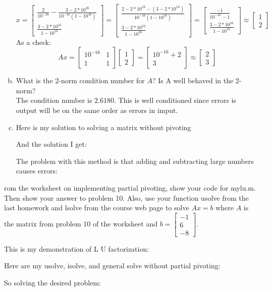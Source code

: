 \documentclass[12pt]{article}
\makeatletter
\theoremstyle{homework}
\newenvironment{exercise}[1]
{\def\@currentlabel{#1}\exercisecore}
{\endexercisecore}
\makeatother
\begin{document}
\begin{enumerate}[(a)]
$$x=
\begin{bmatrix}
\frac{2}{10^{-16}}-\frac{3-2*10^{16}}{10^{-16}(1-10^{16})}\\
\frac{3-2*10^{16}}{1-10^{16}}
\end{bmatrix}=
\begin{bmatrix}
\frac{2-2*10^{16}-(3-2*10^{16})}{10^{-16}(1-10^{16})}\\
\frac{3-2*10^{16}}{1-10^{16}}
\end{bmatrix}=
\begin{bmatrix}
\frac{-1}{10^{-16}-1}\\
\frac{3-2*10^{16}}{1-10^{16}}
\end{bmatrix}\approx
\begin{bmatrix}
1\\
2
\end{bmatrix}
$$
As a check:
$$Ax=\begin{bmatrix}
10^{-16} & 1\\
1 & 1
\end{bmatrix}
\begin{bmatrix}
1\\
2
\end{bmatrix}=
\begin{bmatrix}
10^{-16}+2\\
3
\end{bmatrix}\approx
\begin{bmatrix}
2\\
3
\end{bmatrix}
$$
\item
What is the 2-norm condition number for $A$?  Is A well behaved in the 2-norm?\\
The condition number is $2.6180$.  This is well conditioned since errors is output will be on the same order as errors in imput.
\item
Here is my solution to solving a matrix without pivoting

And the solution I get:

The problem with this method is that adding and subtracting large numbers causes errors:

\end{enumerate}
\begin{exercise}

From the worksheet on implementing partial pivoting, show your code for mylu.m. Then
show your answer to problem 10. Also, use your function usolve from the last homework
and lsolve from the course web page to solve $Ax = b$ where $A$ is the matrix from
problem 10 of the worksheet and $b = \begin{bmatrix}-1\\ 6\\ -8\end{bmatrix}$.
\end{exercise}

This is my demonstration of L U factorization:

Here are my usolve, isolve, and general solve without partial pivoting:



So solving the desired problem:

\end{document}
